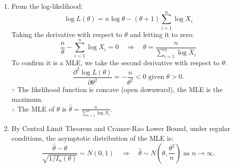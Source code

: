 \documentclass{article}
\begin{document}
\begin{enumerate}
\begin{enumerate}[label=(\roman*)]
    \item From the log-likelihood:
    \[
    \log L(\theta) = n \log \theta - (\theta + 1) \sum_{i=1}^n \log X_i
    \]
    Taking the derivative with respect to \( \theta \) and letting it to zero:
    \[
    \frac{n}{\theta} - \sum_{i=1}^n \log X_i = 0 \quad \Rightarrow \quad \theta = \frac{n}{\sum_{i=1}^n \log X_i}
    \]
    To confirm it is a MLE, we take the second derivative with respect to \( \theta \):
    \[
    \frac{\partial^2 \log L(\theta)}{\partial \theta^2} = -\frac{n}{\theta^2} < 0 \text{ given } \theta > 0.
    \]
    $\because$ The likelihood function is concave (open downward), the MLE is the maximum. \\
    $\therefore$ The MLE of \( \theta \) is $\hat{\theta} = \frac{n}{\sum_{i=1}^n \log X_i}$.

    \item
    By Central Limit Theorem and Cramer-Rao Lower Bound, under regular conditions, the asymptotic distribution of the MLE is:
    \[
    \frac{\hat{\theta} - \theta}{\sqrt{1/I_n(\theta)}} \sim N(0, 1) \quad \Rightarrow \quad \hat{\theta} \sim N\left( \theta, \frac{\theta^2}{n} \right) \text{ as } n \to \infty.
    \] 
    \end{enumerate}

\end{enumerate}
\end{document}
